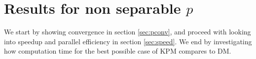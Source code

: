 \chapter{Results for non separable $p$} \label{sec:para}%
We start by showing convergence in section \ref{sec:pconv}, and proceed with looking into speedup and parallel efficiency in section \ref{sec:speed}. We end by investigating how computation time for the best possible case of KPM compares to DM. 

